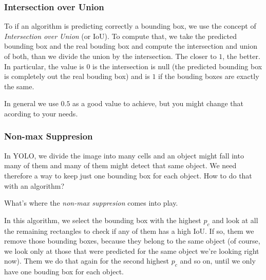 \documentclass[12pt, a4paper, oneside]{book}
\begin{document}
\subsubsection{Intersection over Union}%
\label{ssub:intersection_over_union}

To if an algorithm is predicting correctly a bounding box, we use the concept of
\textit{Intersection over Union} (or IoU). To compute that, we take the
predicted bounding box and the real bouding box and compute the intersection and
union of both, than we divide the union by the intersection. The closer to $1$,
the better. In particular, the value is $0$ is the intersection is null (the
predicted bounding box is completely out the real bouding box) and is $1$ if the
bouding boxes are exactly the same.

In general we use $0.5$ as a good value to achieve, but you might change that
acording to your needs.

\subsubsection{Non-max Suppresion}%
\label{ssub:non_max_suppresion}

In YOLO, we divide the image into many cells and an object might fall into many
of them and many of them might detect that same object. We need therefore a way
to keep just one bounding box for each object. How to do that with an algorithm?

What's where the \textit{non-max suppresion} comes into play.

In this algorithm, we select the bounding box with the highest $p_c$ and look at
all the remaining rectangles to check if any of them has a high IoU. If so, them
we remove those bounding boxes, because they belong to the same object (of
course, we look only at those that were predicted for the same object we're
looking right now). Them we do that again for the second highest $p_c$ and so
on, until we only have one bouding box for each object.
\end{document}

